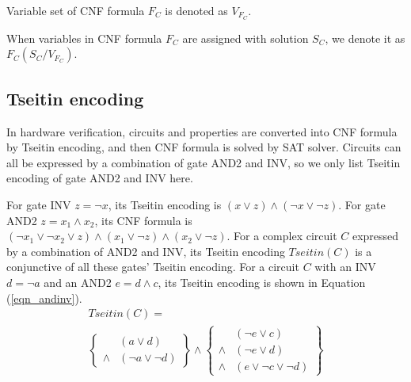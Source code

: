 \documentclass[conference]{IEEEtran}
\newtheorem{definition}{\textbf{Definition}}
\begin{document}
Variable set of CNF formula $F_C$ is denoted as $V_{F_C}$.

When variables in CNF formula $F_C$ are assigned with solution $S_C$, we denote it as $F_C(S_C/V_{F_C})$.

\subsection{Tseitin encoding}

In hardware verification,
circuits and properties are converted into CNF formula by Tseitin encoding\cite{Tseitin},
and then CNF formula is solved by SAT solver.
Circuits can all be expressed by a combination of gate AND2 and INV,
so we only list Tseitin encoding of gate AND2 and INV here.

For gate INV $z=\neg x$,
its Tseitin encoding is  $(x\vee z)\wedge( \neg x\vee \neg z)$.
For gate AND2 $z=x_1\wedge x_2$,
its CNF formula is $( \neg x_1\vee \neg x_2\vee z)\wedge(x_1\vee \neg z) \wedge(x_2\vee \neg z)$.
For a complex circuit $C$ expressed by a combination of AND2 and INV,
its Tseitin encoding $Tseitin(C)$ is a conjunctive of all these gates' Tseitin encoding.
For a circuit $C$ with an INV $d=\neg a$ and an AND2 $e=d\wedge c$,
its Tseitin encoding is shown in Equation (\ref{eqn_andinv}).
\begin{multline}\label{eqn_andinv}
Tseitin(C)=\\
\left\{
\begin{array}{cc}
& (a\vee d) \\
\wedge & (\neg a\vee \neg d)
\end{array}
\right\}\wedge\left\{
\begin{array}{cc}
& (\neg e\vee c) \\
\wedge & (\neg e\vee d) \\
\wedge & (e\vee \neg c\vee\neg d)
\end{array}
\right\}
\end{multline}
\end{document}
